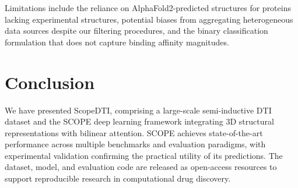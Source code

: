 \documentclass[11pt]{article}
\begin{document}
Limitations include the reliance on AlphaFold2-predicted structures for proteins lacking experimental structures, potential biases from aggregating heterogeneous data sources despite our filtering procedures, and the binary classification formulation that does not capture binding affinity magnitudes.

\section{Conclusion}

We have presented ScopeDTI, comprising a large-scale semi-inductive DTI dataset and the SCOPE deep learning framework integrating 3D structural representations with bilinear attention. SCOPE achieves state-of-the-art performance across multiple benchmarks and evaluation paradigms, with experimental validation confirming the practical utility of its predictions. The dataset, model, and evaluation code are released as open-access resources to support reproducible research in computational drug discovery.



\end{document}
